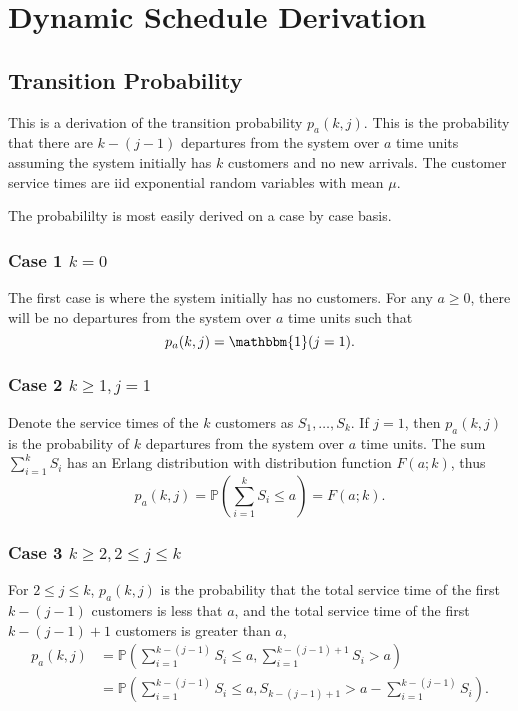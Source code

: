 \chapter{Dynamic Schedule Derivation}
\section{Transition Probability}
This is a derivation of the transition probability $p_{a} (k, j)$. This is the probability that there are $k - (j - 1)$ departures from the system over $a$ time units assuming the system initially has $k$ customers and no new arrivals. The customer service times are iid exponential random variables with mean $\mu$.

The probabililty is most easily derived on a case by case basis.

\subsection{Case 1 $k = 0$}
The first case is where the system initially has no customers. For any $a \geq 0$, there will be no departures from the system over $a$ time units such that
\begin{equation}
	p_{a} (k, j) = \mathbbm{1} (j = 1).
\end{equation}

\subsection{Case 2 $k \geq 1, j = 1$}
Denote the service times of the $k$ customers as $S_{1}, \ldots, S_{k}$. If $j = 1$, then $p_{a} (k, j)$ is the probability of $k$ departures from the system over $a$ time units. The sum $\sum_{i = 1}^{k} S_{i}$ has an Erlang distribution with distribution function $F (a; k)$, thus
\begin{equation}
	p_{a} (k, j) = \mathbb{P} \left( \sum_{i = 1}^{k} S_{i} \leq a \right) = F (a; k).
\end{equation}

\subsection{Case 3 $k \geq 2, 2 \leq j \leq k$}
For $2 \leq j \leq k$, $p_{a} (k, j)$ is the probability that the total service time of the first $k - (j - 1)$ customers is less that $a$, and the total service time of the first $k - (j - 1) + 1$ customers is greater than $a$,
\begin{equation}
	\begin{split}
		p_{a} (k, j)
		& = \mathbb{P} \left( \sum_{i = 1}^{k - (j - 1)} S_{i} \leq a, \sum_{i = 1}^{k - (j - 1) + 1} S_{i} > a \right) \\
		& = \mathbb{P} \left( \sum_{i = 1}^{k - (j - 1)} S_{i} \leq a, S_{k - (j - 1) + 1} > a - \sum_{i = 1}^{k - (j - 1)} S_{i} \right).
	\end{split}
\end{equation}

